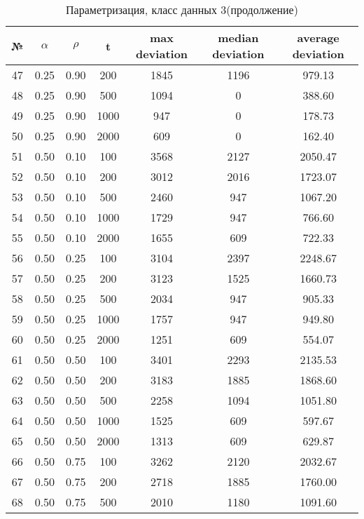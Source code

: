 \documentclass[a4paper, 12pt, unknownkeysallowed]{extreport}
\begin{document}
\begin{center}
  \captionsetup{justification=raggedright,singlelinecheck=off}
  \begin{longtable}[c]{|c|c|c|c|c|c|c|}
  \caption{Параметризация, класс данных 3(продолжение)\label{tbl:p_3_2}} \\ \hline
  № & $\alpha$ & $\rho$ & t & max deviation & median deviation & average deviation \\ \hline   
  47 & 0.25 & 0.90 &   200 & 1845 & 1196 & 979.13 \\ \hline
  48 & 0.25 & 0.90 &   500 & 1094 &    0 & 388.60 \\ \hline
  49 & 0.25 & 0.90 &  1000 &  947 &    0 & 178.73 \\ \hline
  50 & 0.25 & 0.90 &  2000 &  609 &    0 & 162.40 \\ \hline
  51 & 0.50 & 0.10 &   100 & 3568 & 2127 & 2050.47 \\ \hline
  52 & 0.50 & 0.10 &   200 & 3012 & 2016 & 1723.07 \\ \hline
  53 & 0.50 & 0.10 &   500 & 2460 &  947 & 1067.20 \\ \hline
  54 & 0.50 & 0.10 &  1000 & 1729 &  947 & 766.60 \\ \hline
  55 & 0.50 & 0.10 &  2000 & 1655 &  609 & 722.33 \\ \hline
  56 & 0.50 & 0.25 &   100 & 3104 & 2397 & 2248.67 \\ \hline
  57 & 0.50 & 0.25 &   200 & 3123 & 1525 & 1660.73 \\ \hline
  58 & 0.50 & 0.25 &   500 & 2034 &  947 & 905.33 \\ \hline
  59 & 0.50 & 0.25 &  1000 & 1757 &  947 & 949.80 \\ \hline
  60 & 0.50 & 0.25 &  2000 & 1251 &  609 & 554.07 \\ \hline
  61 & 0.50 & 0.50 &   100 & 3401 & 2293 & 2135.53 \\ \hline
  62 & 0.50 & 0.50 &   200 & 3183 & 1885 & 1868.60 \\ \hline
  63 & 0.50 & 0.50 &   500 & 2258 & 1094 & 1051.80 \\ \hline
  64 & 0.50 & 0.50 &  1000 & 1525 &  609 & 597.67 \\ \hline
  65 & 0.50 & 0.50 &  2000 & 1313 &  609 & 629.87 \\ \hline
  66 & 0.50 & 0.75 &   100 & 3262 & 2120 & 2032.67 \\ \hline
  67 & 0.50 & 0.75 &   200 & 2718 & 1885 & 1760.00 \\ \hline
  68 & 0.50 & 0.75 &   500 & 2010 & 1180 & 1091.60 \\ \hline

\end{longtable}
\end{center}
\end{document}

